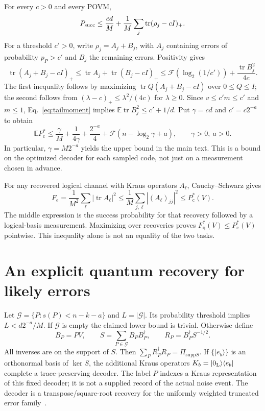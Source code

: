 \documentclass[aps,prl,onecolumn,superscriptaddress,amsmath,amssymb]{revtex4-2}
\newcommand{\E}{\mathbb E}
\newcommand{\tr}{\operatorname{tr}}
\newcommand{\Pc}{P_{\mathrm c}^{*}}
\newcommand{\Fq}{F_{\mathrm q}^{*}}
\newcommand{\Fs}{\mathcal F}
\begin{document}
For every $c>0$ and every POVM,
\begin{equation}
P_{\rm succ}\le\frac{cd}{M}+\frac1M\sum_j\tr(\rho_j-cI)_+.
\label{eq:positive}
\end{equation}
For a threshold $c'>0$, write $\rho_j=A_j+B_j$, with $A_j$ containing errors of probability $p_P>c'$ and $B_j$ the remaining errors. Positivity gives
\begin{equation}
\tr(A_j+B_j-cI)_+\le\tr A_j+\tr(B_j-cI)_+\le \Fs(\log_2(1/c'))+\frac{\tr B_j^2}{4c}.
\end{equation}
The first inequality follows by maximizing $\tr Q(A_j+B_j-cI)$ over $0\le Q\le I$; the second follows from $(\lambda-c)_+\le\lambda^2/(4c)$ for $\lambda\ge0$. Since $v\le c'm\le c'$ and $m\le1$, Eq.~\eqref{eq:tailmoment} implies $\E\tr B_j^2\le c'+1/d$. Put $\gamma=cd$ and $c'=c2^{-a}$ to obtain
\begin{equation}
\E\Pc\le\frac\gamma M+\frac1{4\gamma}+\frac{2^{-a}}4+
\Fs(n-\log_2\gamma+a),\qquad \gamma>0,\ a>0.
\label{eq:converse}
\end{equation}
In particular, $\gamma=M2^{-a}$ yields the upper bound in the main text. This is a bound on the optimized decoder for each sampled code, not just on a measurement chosen in advance.

For any recovered logical channel with Kraus operators $A_\ell$, Cauchy--Schwarz gives
\begin{equation}
F_e=\frac1{M^2}\sum_\ell|\tr A_\ell|^2
\le\frac1M\sum_{j,\ell}|(A_\ell)_{jj}|^2\le\Pc(V).
\label{eq:order}
\end{equation}
The middle expression is the success probability for that recovery followed by a logical-basis measurement. Maximizing over recoveries proves $\Fq(V)\le\Pc(V)$ pointwise. This inequality alone is not an equality of the two tasks.

\section{An explicit quantum recovery for likely errors}

Let $\mathcal G=\{P:s(P)<n-k-a\}$ and $L=|\mathcal G|$. Its probability threshold implies $L<d2^{-a}/M$. If $\mathcal G$ is empty the claimed lower bound is trivial. Otherwise define
\begin{equation}
B_P=PV,\qquad S=\sum_{P\in\mathcal G}B_PB_P^\dagger,\qquad
R_P=B_P^\dagger S^{-1/2}.
\label{eq:recovery}
\end{equation}
All inverses are on the support of $S$. Then $\sum_PR_P^\dagger R_P=\Pi_{\mathrm{supp}S}$. If $\{|e_b\rangle\}$ is an orthonormal basis of $\ker S$, the additional Kraus operators $K_b=|0_{\rm L}\rangle\langle e_b|$ complete a trace-preserving decoder. The label $P$ indexes a Kraus representation of this fixed decoder; it is not a supplied record of the actual noise event. The decoder is a transpose/square-root recovery for the uniformly weighted truncated error family~\cite{BarnumKnill}.
\end{document}
